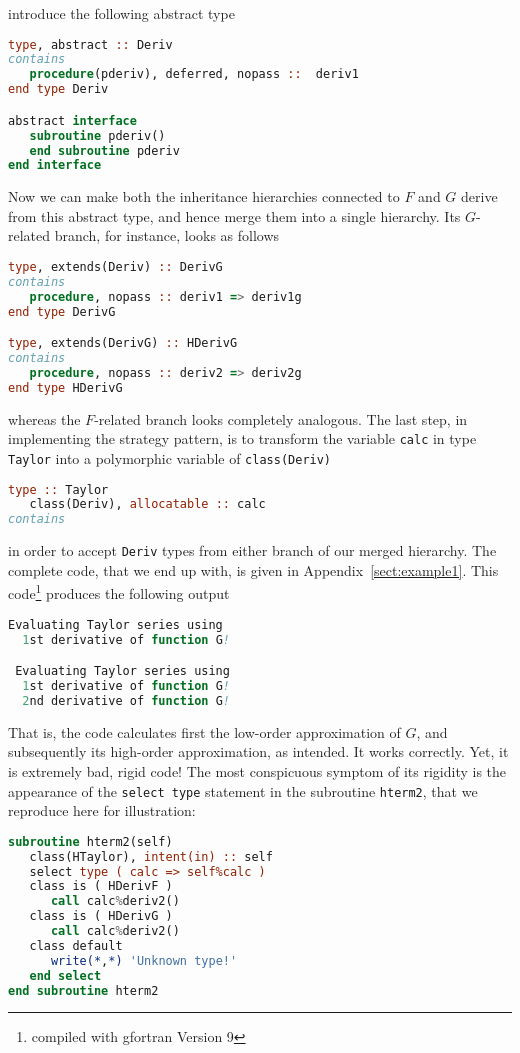 \documentclass[11pt,oneside]{article}
\begin{document}
introduce the following abstract type
\begin{lstlisting}[language=Fortran]
type, abstract :: Deriv
contains
   procedure(pderiv), deferred, nopass ::  deriv1
end type Deriv

abstract interface
   subroutine pderiv()
   end subroutine pderiv      
end interface
\end{lstlisting}
Now we can make both the inheritance hierarchies connected to $F$ and $G$
derive from this abstract type, and hence merge them into a single
hierarchy. Its $G$-related branch, for instance, looks as follows
\begin{lstlisting}[language=Fortran]
type, extends(Deriv) :: DerivG
contains
   procedure, nopass :: deriv1 => deriv1g
end type DerivG

type, extends(DerivG) :: HDerivG
contains
   procedure, nopass :: deriv2 => deriv2g
end type HDerivG
\end{lstlisting}
whereas the $F$-related branch looks completely analogous. The last
step, in implementing the strategy pattern, is to transform the variable
\texttt{calc} in type \texttt{Taylor} into a polymorphic variable of
\texttt{class(Deriv)}
\begin{lstlisting}[language=Fortran]
type :: Taylor
   class(Deriv), allocatable :: calc
contains
\end{lstlisting}
in order to accept \texttt{Deriv} types from either branch of our
merged hierarchy. The complete code, that we end up with, is given
in Appendix~\ref{sect:example1}. This code\footnote{compiled
  with gfortran Version 9} produces the following output
\begin{lstlisting}[language=Fortran]
 Evaluating Taylor series using
  1st derivative of function G!

 Evaluating Taylor series using
  1st derivative of function G!
  2nd derivative of function G!
\end{lstlisting}
That is, the code calculates first the low-order approximation of $G$,
and subsequently its high-order approximation, as intended. It works
correctly. Yet, it is extremely bad, rigid code! The most conspicuous
symptom of its rigidity is the appearance of the \texttt{select type}
statement in the subroutine \texttt{hterm2}, that we reproduce here for
illustration:
\begin{lstlisting}[language=Fortran]
subroutine hterm2(self)
   class(HTaylor), intent(in) :: self
   select type ( calc => self%calc )
   class is ( HDerivF )
      call calc%deriv2()
   class is ( HDerivG )
      call calc%deriv2()
   class default
      write(*,*) 'Unknown type!'
   end select
end subroutine hterm2
\end{lstlisting}
\end{document}
